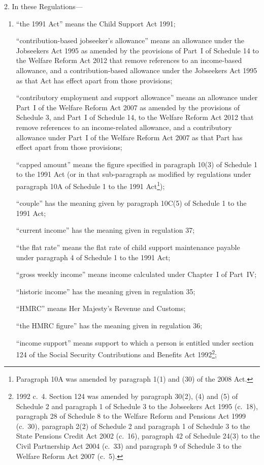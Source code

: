 \documentclass[12pt,a4paper]{article}
\begin{document}
2.  In these Regulations—
\begin{enumerate}\item[]
“the 1991 Act” means the Child Support Act 1991;

“contribution-based jobseeker’s allowance” means an allowance under the Jobseekers Act 1995 as amended by the provisions of Part~I of Schedule 14 to the Welfare Reform Act 2012 that remove references to an income-based allowance, and a contribution-based allowance under the Jobseekers Act 1995 as that Act has effect apart from those provisions;


“contributory employment and support allowance” means an allowance under Part~I of the Welfare Reform Act 2007 as amended by the provisions of Schedule 3, and Part~I of Schedule 14, to the Welfare Reform Act 2012 that remove references to an income-related allowance, and a contributory allowance under Part~I of the Welfare Reform Act 2007 as that Part has effect apart from those provisions;

“capped amount” means the figure specified in paragraph 10(3) of Schedule 1 to the 1991 Act (or in that sub-paragraph as modified by regulations under paragraph 10A of Schedule 1 to the 1991 Act\footnote{Paragraph 10A was amended by paragraph 1(1) and (30) of the 2008 Act.});

“couple” has the meaning given by paragraph 10C(5) of Schedule 1 to the 1991 Act;

“current income” has the meaning given in regulation 37;

“the flat rate” means the flat rate of child support maintenance payable under paragraph 4 of Schedule 1 to the 1991 Act;

“gross weekly income” means income calculated under Chapter~I of Part~IV;

“historic income” has the meaning given in regulation 35;

“HMRC” means Her Majesty’s Revenue and Customs;

“the HMRC figure” has the meaning given in regulation 36;

“income support” means support to which a person is entitled under section 124 of the Social Security Contributions and Benefits Act 1992\footnote{1992 c.~4. Section 124 was amended by paragraph 30(2), (4) and (5) of Schedule 2 and paragraph 1 of Schedule 3 to the Jobseekers Act 1995 (c.~18), paragraph 28 of Schedule 8 to the Welfare Reform and Pensions Act 1999 (c.~30), paragraph 2(2) of Schedule 2 and paragraph 1 of Schedule 3 to the State Pensions Credit Act 2002 (c.~16), paragraph 42 of Schedule 24(3) to the Civil Partnership Act 2004 (c.~33) and paragraph 9 of Schedule 3 to the Welfare Reform Act 2007 (c.~5).};


\end{enumerate}
\end{document}
